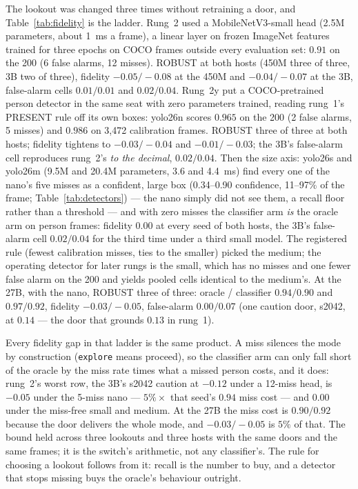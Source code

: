 \documentclass[11pt]{article}
\begin{document}
The lookout was changed three times without retraining a door, and
Table~\ref{tab:fidelity} is the ladder. Rung~2 used a MobileNetV3-small head
(2.5M parameters, about 1~ms a frame), a linear layer on frozen ImageNet
features trained for three epochs on COCO frames outside every
evaluation set: $0.91$ on the 200 (6 false alarms, 12 misses). ROBUST at
both hosts (450M three of three, 3B two of three), fidelity $-0.05 /
-0.08$ at the 450M and $-0.04 / -0.07$ at the 3B, false-alarm cells
$0.01 / 0.01$ and $0.02 / 0.04$. Rung~2y put a COCO-pretrained person
detector in the same seat with zero parameters trained, reading rung~1's
PRESENT rule off its own boxes: yolo26n scores $0.965$ on the 200 (2
false alarms, 5 misses) and $0.986$ on 3,472 calibration frames. ROBUST
three of three at both hosts; fidelity tightens to $-0.03 / -0.04$ and
$-0.01 / -0.03$; the 3B's false-alarm cell reproduces rung~2's
\emph{to the decimal}, $0.02 / 0.04$. Then the size axis: yolo26s and
yolo26m (9.5M and 20.4M parameters, 3.6 and 4.4~ms) find every one of
the nano's five misses as a confident, large box (0.34--0.90 confidence,
11--97\% of the frame; Table~\ref{tab:detectors}) --- the nano simply did
not see them, a recall floor rather than a threshold --- and with zero
misses the classifier arm \emph{is} the oracle arm on person frames:
fidelity $0.00$ at every seed of both hosts, the 3B's false-alarm cell
$0.02 / 0.04$ for the third time under a third small model. The
registered rule (fewest calibration misses, ties to the smaller) picked
the medium; the operating detector for later rungs is the small, which
has no misses and one fewer false alarm on the 200 and yields pooled
cells identical to the medium's. At the 27B, with the nano, ROBUST three
of three: oracle / classifier $0.94 / 0.90$ and $0.97 / 0.92$, fidelity
$-0.03 / -0.05$, false-alarm $0.00 / 0.07$ (one caution door, s2042,
at $0.14$ --- the door that grounds $0.13$ in rung~1).

Every fidelity gap in that ladder is the same product. A miss silences
the mode by construction (\texttt{explore} means proceed), so the
classifier arm can only fall short of the oracle by the miss rate times
what a missed person costs, and it does: rung~2's worst row, the 3B's
s2042 caution at $-0.12$ under a 12-miss head, is $-0.05$ under the
5-miss nano --- $5\%\times$ that seed's $0.94$ miss cost --- and $0.00$
under the miss-free small and medium. At the 27B the miss cost is
$0.90 / 0.92$ because the door delivers the whole mode, and
$-0.03 / -0.05$ is $5\%$ of that. The bound held across three lookouts
and three hosts with the same doors and the same frames; it is the
switch's arithmetic, not any classifier's. The rule for choosing a
lookout follows from it: recall is the number to buy, and a detector
that stops missing buys the oracle's behaviour outright.
\end{document}
